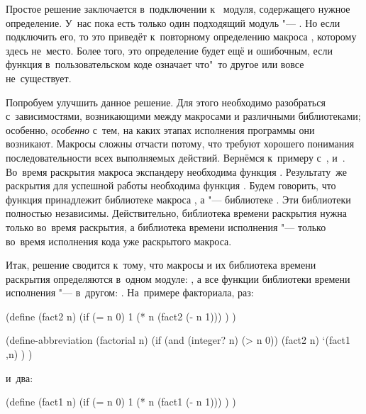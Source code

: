 Простое решение заключается в~подключении к~ модуля,
содержащего нужное определение. У~нас пока есть только один подходящий модуль
"--- . Но если подключить его, то это приведёт к~повторному
определению макроса , которому здесь не~место. Более того, это
определение будет ещё и ошибочным, если функция 
в~пользовательском коде означает что"~то другое или вовсе не~существует.

Попробуем улучшить данное решение. Для этого необходимо разобраться
с~зависимостями, возникающими между макросами и различными библиотеками;
особенно, \emph{особенно} с~тем, на каких этапах исполнения программы они
возникают. Макросы сложны отчасти потому, что требуют хорошего понимания
последовательности всех выполняемых действий. Вернёмся к~примеру с~,
 и~. Во~время раскрытия макроса 
экспандеру необходима функция . Результату~же раскрытия для успешной
работы необходима функция . Будем говорить, что функция 
принадлежит библиотеке  макроса , а
 "--- библиотеке  . Эти
библиотеки полностью независимы. Действительно, библиотека времени раскрытия
нужна только во~время раскрытия, а библиотека времени исполнения "--- только
во~время исполнения кода уже раскрытого макроса.

Итак, решение сводится к~тому, что макросы и их библиотека времени раскрытия
определяются в~одном модуле: , а все функции библиотеки времени
исполнения "--- в~другом: .  На~примере
факториала, раз:


\begin{code:lisp-framed}[title={\snippet{si/libexp.scm}}]
(define (fact2 n)
  (if (= n 0) 1
      (* n (fact2 (- n 1))) ) )

(define-abbreviation (factorial n)
  (if (and (integer? n) (> n 0))
      (fact2 n)
      `(fact1 ,n) ) )
\end{code:lisp-framed}

\noindent и~два:

\begin{code:lisp-framed}[title={\snippet{si/librun.scm}}]
(define (fact1 n)
  (if (= n 0) 1
      (* n (fact1 (- n 1))) ) )
\end{code:lisp-framed}

